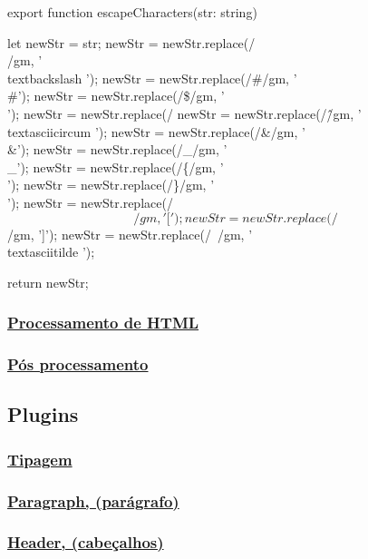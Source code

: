 \begin{codeEscape}
	export function escapeCharacters(str: string){
	    let newStr = str;
	    newStr = newStr.replace(/\\/gm, '\\textbackslash ');
	    newStr = newStr.replace(/#/gm, '\\#');
	    newStr = newStr.replace(/\$/gm, '\\$$');
	    newStr = newStr.replace(/%
	    newStr = newStr.replace(/\^/gm, '\\textasciicircum ');
	    newStr = newStr.replace(/&/gm, '\\&');
	    newStr = newStr.replace(/_/gm, '\\_');
	    newStr = newStr.replace(/\{/gm, '\\{');
	    newStr = newStr.replace(/\}/gm, '\\}');
	    newStr = newStr.replace(/\[/gm, '{[}');
	    newStr = newStr.replace(/\]/gm, '{]}');
	    newStr = newStr.replace(/~/gm, '\\textasciitilde ');
	
	    return newStr;
	}
\end{codeEscape}

\subsubsection{\underline{Processamento de HTML}}

\subsubsection{\underline{Pós processamento}}

\subsection{Plugins}

\subsubsection{\underline{Tipagem}}

\subsubsection{\underline{Paragraph, (parágrafo)}}

\subsubsection{\underline{Header, (cabeçalhos)}}

